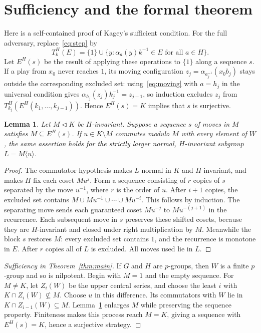 \documentclass[11pt]{article}
\newtheorem{lemma}[theorem]{Lemma}
\newcommand{\al}{\alpha}
\begin{document}
\section{Sufficiency and the formal theorem}\label{sec:suff}
Here is a self-contained proof of Kagey's sufficient condition. For the
full adversary, replace~\eqref{eq:step} by
\[
 T^H_k(E)=\{1\}\cup\{y:\al_a(y)k^{-1}\in E\text{ for all }a\in H\}.
\]
Let $E^H(s)$ be the result of applying these operations to $\{1\}$ along
a sequence $s$. If a play from $x_0$ never reaches $1$, its moving
configuration $z_j=\al_{a_j^{-1}}(x_0b_j)$ stays outside the corresponding
excluded set: using~\eqref{eq:moving} with $a=h_j$ in the universal
condition gives $\al_{h_j}(z_j)k_j^{-1}=z_{j-1}$, so induction excludes
$z_j$ from $T^H_{k_j}(E^H(k_1,\ldots,k_{j-1}))$.
Hence $E^H(s)=K$ implies that $s$ is surjective.

\begin{lemma}\label{lem:extension}
Let $M\lhd K$ be $H$-invariant. Suppose a sequence $s$ of moves in $M$
satisfies $M\subseteq E^H(s)$. If $u\in K\setminus M$ commutes modulo $M$
with every element of $W$, the same assertion holds for the strictly
larger normal, $H$-invariant subgroup $L=M\langle u\rangle$.
\end{lemma}
\begin{proof}
The commutator hypothesis makes $L$ normal in $K$ and $H$-invariant,
and makes $H$ fix each coset $Mu^j$. Form a sequence consisting of $r$
copies of $s$ separated by the move $u^{-1}$, where $r$ is the order of $u$.
After $i+1$ copies, the excluded set contains
$M\cup Mu^{-1}\cup\cdots\cup Mu^{-i}$. This follows by induction.
The separating move sends each guaranteed coset $Mu^{-j}$ to
$Mu^{-(j+1)}$ in the recurrence. Each subsequent move in $s$ preserves
these shifted cosets, because they are $H$-invariant and closed under
right multiplication by $M$. Meanwhile the block $s$ restores $M$:
every excluded set contains $1$, and the recurrence is monotone in $E$.
After $r$ copies all of $L$ is excluded. All moves used lie in $L$.
\end{proof}

\begin{proof}[Sufficiency in Theorem~\ref{thm:main}]
If $G$ and $H$ are $p$-groups, then $W$ is a finite $p$-group and so is
nilpotent. Begin with $M=1$ and the empty sequence. For $M\neq K$, let
$Z_i(W)$ be the upper central series, and choose the least $i$ with
$K\cap Z_i(W)\nsubseteq M$. Choose $u$ in this difference. Its commutators
with $W$ lie in $K\cap Z_{i-1}(W)\subseteq M$.
Lemma~\ref{lem:extension} enlarges $M$ while preserving the sequence
property. Finiteness makes this process reach $M=K$, giving a sequence
with $E^H(s)=K$, hence a surjective strategy.
\end{proof}
\end{document}
